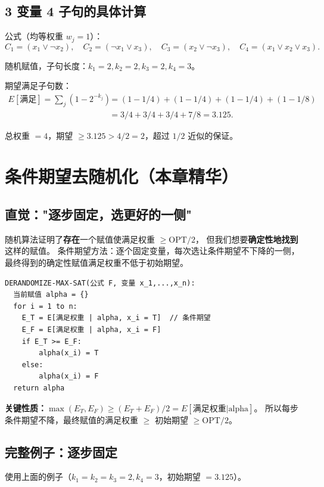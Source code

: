\documentclass[UTF8,openany,12pt]{ctexbook}
\theoremstyle{remark}
\newcommand{\OPT}{\mathrm{OPT}}
\begin{document}
\subsection{3 变量 4 子句的具体计算}

公式（均等权重 $w_j=1$）：
\[
  C_1 = (x_1 \vee \neg x_2),\quad
  C_2 = (\neg x_1 \vee x_3),\quad
  C_3 = (x_2 \vee \neg x_3),\quad
  C_4 = (x_1 \vee x_2 \vee x_3).
\]

随机赋值，子句长度：$k_1=2, k_2=2, k_3=2, k_4=3$。

期望满足子句数：
\begin{align*}
  E[\text{满足}] = \sum_j (1-2^{-k_j})
  &= (1-1/4)+(1-1/4)+(1-1/4)+(1-1/8)\\
  &= 3/4+3/4+3/4+7/8
   = 3.125.
\end{align*}

总权重 $= 4$，期望 $\ge 3.125 > 4/2 = 2$，超过 $1/2$ 近似的保证。

\section{条件期望去随机化（本章精华）}

\subsection{直觉："逐步固定，选更好的一侧"}

随机算法证明了\textbf{存在}一个赋值使满足权重 $\ge \OPT/2$，
但我们想要\textbf{确定性地找到}这样的赋值。
条件期望方法：逐个固定变量，每次选让条件期望不下降的一侧，
最终得到的确定性赋值满足权重不低于初始期望。

\begin{lstlisting}[language={}]
DERANDOMIZE-MAX-SAT(公式 F, 变量 x_1,...,x_n):
  当前赋值 alpha = {}
  for i = 1 to n:
    E_T = E[满足权重 | alpha, x_i = T]  // 条件期望
    E_F = E[满足权重 | alpha, x_i = F]
    if E_T >= E_F:
        alpha(x_i) = T
    else:
        alpha(x_i) = F
  return alpha
\end{lstlisting}

\textbf{关键性质：}$\max(E_T, E_F) \ge (E_T + E_F)/2 = E[\text{满足权重} | \text{alpha}]$。
所以每步条件期望不降，最终赋值的满足权重 $\ge$ 初始期望 $\ge \OPT/2$。

\subsection{完整例子：逐步固定}

使用上面的例子（$k_1=k_2=k_3=2, k_4=3$，初始期望 $= 3.125$）。
\end{document}

